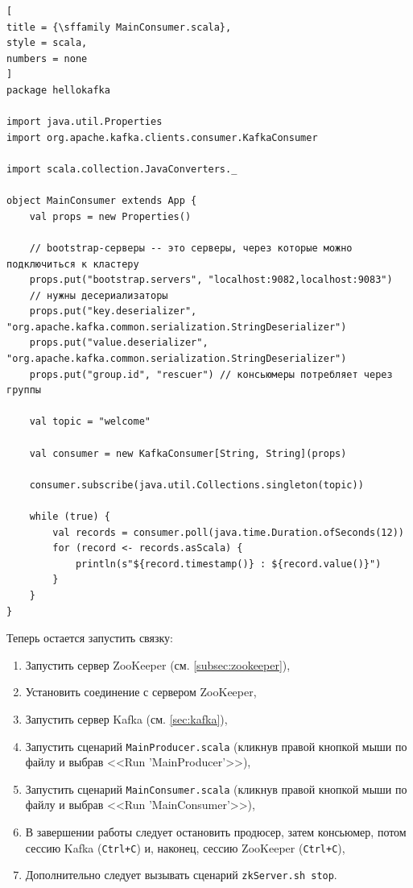 \documentclass[%
	11pt,
	a4paper,
	utf8,
		]{article}
\begin{document}
\begin{lstlisting}[
title = {\sffamily MainConsumer.scala},
style = scala,
numbers = none	
]
package hellokafka

import java.util.Properties
import org.apache.kafka.clients.consumer.KafkaConsumer

import scala.collection.JavaConverters._

object MainConsumer extends App {
	val props = new Properties()
	
	// bootstrap-серверы -- это серверы, через которые можно подключиться к кластеру
	props.put("bootstrap.servers", "localhost:9082,localhost:9083")
	// нужны десериализаторы
	props.put("key.deserializer", "org.apache.kafka.common.serialization.StringDeserializer")
	props.put("value.deserializer", "org.apache.kafka.common.serialization.StringDeserializer")
	props.put("group.id", "rescuer") // консьюмеры потребляет через группы
	
	val topic = "welcome"
	
	val consumer = new KafkaConsumer[String, String](props)
	
	consumer.subscribe(java.util.Collections.singleton(topic))
	
	while (true) {
		val records = consumer.poll(java.time.Duration.ofSeconds(12))
		for (record <- records.asScala) {
			println(s"${record.timestamp()} : ${record.value()}")
		}
	}	
}
\end{lstlisting}

Теперь остается запустить связку:
\begin{enumerate}
	\item Запустить сервер ZooKeeper (см. \ref{subsec:zookeeper}),
	
	\item Установить соединение с сервером ZooKeeper,
	
	\item Запустить сервер Kafka (см. \ref{sec:kafka}),
	
	\item Запустить сценарий \texttt{MainProducer.scala} (кликнув правой кнопкой мыши по файлу и выбрав <<Run 'MainProducer'>>),
	
	\item Запустить сценарий \texttt{MainConsumer.scala} (кликнув правой кнопкой мыши по файлу и выбрав <<Run 'MainConsumer'>>),
	
	\item В завершении работы следует остановить продюсер, затем консьюмер, потом сессию Kafka (\texttt{Ctrl+C}) и, наконец, сессию ZooKeeper (\texttt{Ctrl+C}),
	
	\item Дополнительно следует вызывать сценарий \texttt{zkServer.sh stop}.
\end{enumerate}
\end{document}
